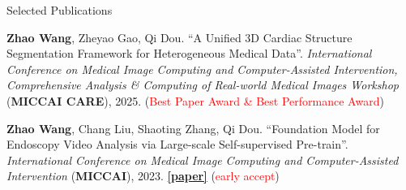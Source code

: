 \documentclass[a4paper]{resume} %
\newcommand{\hl}[1]{\textcolor{red}{#1}}
\begin{document}
\begin{rSection}{Selected Publications}
\begin{enumerate}[label={[\arabic*]}, topsep=0em, leftmargin=1.4em, itemsep=-0.5em]


\item {\bf Zhao Wang},  Zheyao Gao, Qi Dou. “A Unified 3D Cardiac Structure Segmentation Framework for Heterogeneous Medical Data”. {\it International Conference on Medical Image Computing and Computer-Assisted Intervention, Comprehensive Analysis \& Computing of Real-world Medical Images Workshop} ({\bf MICCAI CARE}), 2025.  (\hl{Best Paper Award \& Best Performance Award}) %


	

\item {\bf Zhao Wang}, Chang Liu, Shaoting Zhang, Qi Dou. “Foundation Model for Endoscopy Video Analysis via Large-scale Self-supervised Pre-train”. {\it International Conference on Medical Image Computing and Computer-Assisted Intervention} ({\bf MICCAI}), 2023. \href{https://arxiv.org/abs/2306.16741}{\bf [paper]} (\hl{early accept})




\end{enumerate}
\end{rSection}
\end{document}
